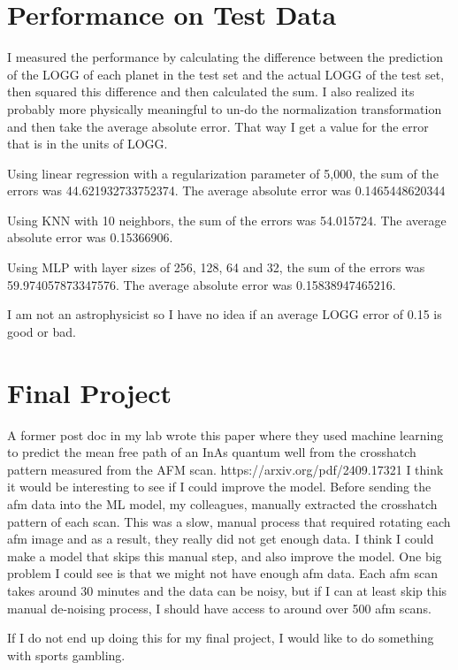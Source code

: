 \documentclass[11pt]{article}
\begin{document}
\section{Performance on Test Data}
\indent
I measured the performance by calculating the difference between the 
prediction of the LOGG of each planet in the test set and the actual 
LOGG of the test set, then squared this difference and then calculated the sum. I also realized its probably more physically meaningful to un-do the normalization transformation and then take the average absolute error. That way I get a value for the error that is in the units of LOGG.
\par
Using linear regression with a regularization parameter of 5,000, the sum of the errors was 44.621932733752374. The average absolute error was 0.1465448620344
\par
Using KNN with 10 neighbors, the sum of the errors was 54.015724. 
The average absolute error was 0.15366906.
\par
Using MLP with layer sizes of 256, 128, 64 and 32, the sum of the errors was 59.974057873347576. The average absolute error was 0.15838947465216.

\par I am not an astrophysicist so I have no idea if an average LOGG error of 0.15 is good or bad.

\section{Final Project}

A former post doc in my lab wrote this paper where they used machine learning to predict the mean free path of an InAs quantum well from the crosshatch pattern measured from the AFM scan. 
https://arxiv.org/pdf/2409.17321
I think it would be interesting to see if I could improve the model. Before sending the afm data into the ML model, 
my colleagues, manually extracted the crosshatch pattern of each scan. This was a slow, manual process that required rotating each afm image and as a result, they really did not get enough data.
I think I could make a model that skips this manual step, and also improve the model.
One big problem I could see is that we might not have enough afm data. Each afm scan takes around 30 minutes and the data can be noisy, but if I can at least skip this manual de-noising process, I should have access to around over 500 afm scans.

\par If I do not end up doing this for my final project, I would like to do something with sports gambling.
\end{document}
